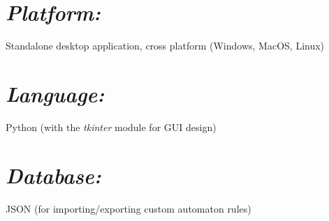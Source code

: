 \documentclass[12pt]{article}
\begin{document}
\begin{FlushLeft}
		\section*{\textit{Platform:}}
		Standalone desktop application, cross platform (Windows, MacOS, Linux)

		\section*{\textit{Language:}}
		Python (with the \textit{tkinter} module for GUI design)

		\section*{\textit{Database:}}
		JSON (for importing/exporting custom automaton rules)
	\end{FlushLeft}
\end{document}
